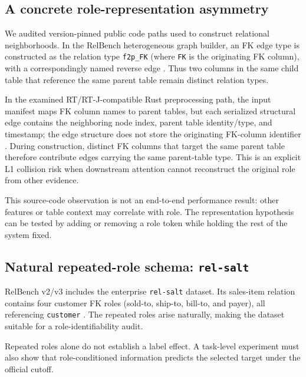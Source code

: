 \documentclass[runningheads]{llncs}
\begin{document}
\subsection{A concrete role-representation asymmetry}
We audited version-pinned public code paths used to construct relational neighborhoods. In the RelBench heterogeneous graph builder, an FK edge type is constructed as
the relation type \texttt{f2p\_FK} (where \texttt{FK} is the originating FK column), with a correspondingly named reverse edge \cite{relbenchcode2026}. Thus two columns in the same child table that reference the same parent table remain distinct relation types.

In the examined RT/RT-J-compatible Rust preprocessing path, the input manifest maps FK column names to parent tables, but each serialized structural edge contains the neighboring node index, parent table identity/type, and timestamp; the edge structure does not store the originating FK-column identifier \cite{rtcode2026}. During construction, distinct FK columns that target the same parent table therefore contribute edges carrying the same parent-table type. This is an explicit L1 collision risk when downstream attention cannot reconstruct the original role from other evidence.

This source-code observation is not an end-to-end performance result: other features or table context may correlate with role. The representation hypothesis can be tested by adding or removing a role token while holding the rest of the system fixed.

\subsection{Natural repeated-role schema: \texttt{rel-salt}}
RelBench v2/v3 includes the enterprise \texttt{rel-salt} dataset. Its sales-item relation contains four customer FK roles (sold-to, ship-to, bill-to, and payer), all referencing \texttt{customer} \cite{relbenchdata2026}. The repeated roles arise naturally, making the dataset suitable for a role-identifiability audit.

Repeated roles alone do not establish a label effect. A task-level experiment must also show that role-conditioned information predicts the selected target under the official cutoff.
\end{document}

